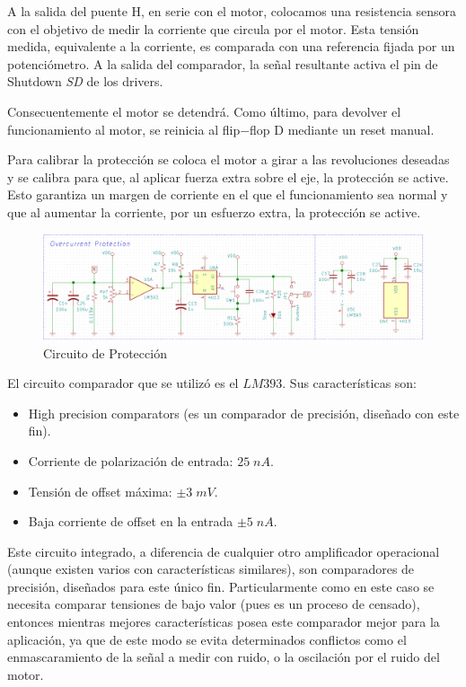 \documentclass[11pt, a4paper]{article}
\begin{document}
A la salida del puente H, en serie con el motor, colocamos una resistencia sensora con el objetivo de medir la corriente que circula por el motor. Esta tensión medida, equivalente a la corriente, es comparada con una referencia fijada por un potenciómetro. A la salida del comparador, la señal resultante activa el pin de Shutdown \textit{SD} de los drivers.

Consecuentemente el motor se detendrá. Como último, para devolver el funcionamiento al motor, se reinicia al flip−flop D mediante un reset manual.

Para calibrar la protección se coloca el motor a girar a las revoluciones deseadas y se calibra para que, al aplicar fuerza extra sobre el eje, la protección se active. Esto garantiza un margen de corriente en el que el funcionamiento sea normal y que al aumentar la corriente, por un esfuerzo extra, la protección se active.


\begin{figure}[h]
	\centering
	\includegraphics[width=\textwidth]{Imagenes/circ_prot.png}
	\caption{Circuito de Protección}
	\label{fig:circ_protecc}
\end{figure} 

El circuito comparador que se utilizó es el $LM393$. Sus características son:
\begin{itemize}
	\item High precision comparators (es un comparador de precisión, diseñado con este fin).
	\item Corriente de polarización de entrada: $25\; nA$.
	\item Tensión de offset máxima: $\pm 3 \; mV$.
    \item Baja corriente de offset en la entrada $\pm 5 \; nA$.
\end{itemize}

Este circuito integrado, a diferencia de cualquier otro amplificador operacional (aunque existen varios con características similares), son comparadores de precisión, diseñados para este único fin. Particularmente como en este caso se necesita comparar tensiones de bajo valor (pues es un proceso de censado), entonces mientras mejores características posea este comparador mejor para la aplicación, ya que de este modo se evita determinados conflictos como el enmascaramiento de la señal a medir con ruido, o la oscilación por el ruido del motor.
\end{document}
